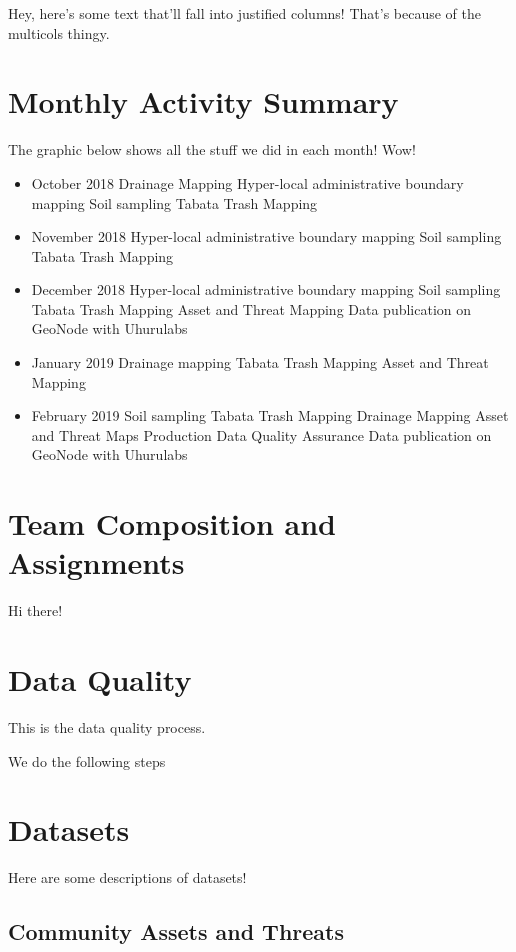 \documentclass[a4paper,12pt,twoside]{article}
\begin{document}
\begin{multicols}{2}
Hey, here's some text that'll fall into justified columns! That's because of the multicols thingy.
\end{multicols}

\newpage
\section{Monthly Activity Summary}

The graphic below shows all the stuff we did in each month! Wow!

\bigskip

\begin{itemize}
    \item October 2018
Drainage Mapping
Hyper-local administrative boundary mapping
Soil sampling
Tabata Trash Mapping
    \item November 2018
Hyper-local administrative boundary mapping
Soil sampling
Tabata Trash Mapping
    \item December 2018
Hyper-local administrative boundary mapping
Soil sampling
Tabata Trash Mapping
Asset and Threat Mapping
Data publication on GeoNode with Uhurulabs
    \item January 2019
Drainage mapping
Tabata Trash Mapping
Asset and Threat Mapping
    \item February 2019
Soil sampling
Tabata Trash Mapping
Drainage Mapping
Asset and Threat Maps Production
Data Quality Assurance
Data publication on GeoNode with Uhurulabs
\end{itemize}

\section{Team Composition and Assignments}
Hi there!

\section{Data Quality}
This is the data quality process. 

We do the following steps


\section{Datasets}
Here are some descriptions of datasets!

\subsection{Community Assets and Threats}
\end{document}
